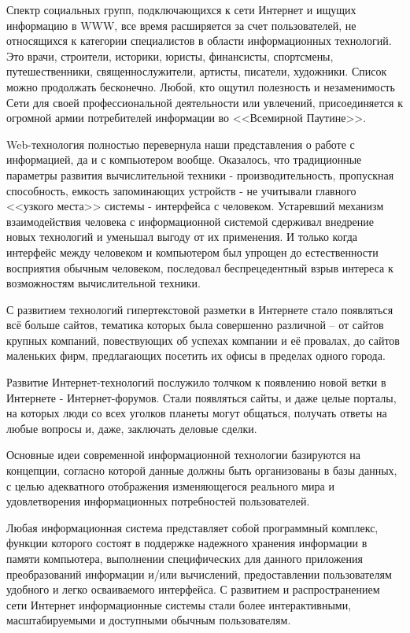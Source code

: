 Спектр социальных групп, подключающихся к сети Интернет и ищущих информацию в WWW, все время расширяется за счет пользователей, не относящихся к категории специалистов в области информационных технологий. Это врачи, строители, историки, юристы, финансисты, спортсмены, путешественники, священнослужители, артисты, писатели, художники. Список можно продолжать бесконечно. Любой, кто ощутил полезность и незаменимость Сети для своей профессиональной деятельности или увлечений, присоединяется к огромной армии потребителей информации во <<Всемирной Паутине>>.

Web-технология полностью перевернула наши представления о работе с информацией, да и с компьютером вообще. Оказалось, что традиционные параметры развития вычислительной техники - производительность, пропускная способность, емкость запоминающих устройств - не учитывали главного <<узкого места>> системы - интерфейса с человеком. Устаревший механизм взаимодействия человека с информационной системой сдерживал внедрение новых технологий и уменьшал выгоду от их применения. И только когда интерфейс между человеком и компьютером был упрощен до естественности восприятия обычным человеком, последовал беспрецедентный взрыв интереса к возможностям вычислительной техники.

С развитием технологий гипертекстовой разметки в Интернете стало появляться всё больше сайтов, тематика которых была совершенно различной – от сайтов крупных компаний, повествующих об успехах компании и её провалах, до сайтов маленьких фирм, предлагающих посетить их офисы в пределах одного города.

Развитие Интернет-технологий послужило толчком к появлению новой ветки в Интернете - Интернет-форумов. Стали появляться сайты, и даже целые порталы, на которых люди со всех уголков планеты могут общаться, получать ответы на любые вопросы и, даже, заключать деловые сделки.

Основные идеи современной информационной технологии базируются на концепции, согласно которой данные должны быть организованы в базы данных, с целью адекватного отображения изменяющегося реального мира и удовлетворения информационных потребностей пользователей.

Любая информационная система представляет собой программный комплекс, функции которого состоят в поддержке надежного хранения информации в памяти компьютера, выполнении специфических для данного приложения преобразований информации и/или вычислений, предоставлении пользователям удобного и легко осваиваемого интерфейса. С развитием и распространением сети Интернет информационные системы стали более интерактивными, масштабируемыми и доступными обычным пользователям.

